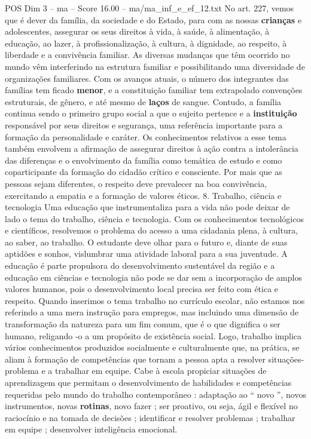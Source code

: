 \begin{textsample}{POS Dim 3 – ma – Score 16.00 – ma/ma\_inf\_e\_ef\_12.txt}
No art. 227, vemos que é dever da família, da sociedade e do Estado, para com as nossas \textbf{crianças} e adolescentes, assegurar os seus direitos à vida, à saúde, à alimentação, à educação, ao lazer, à profissionalização, à cultura, à dignidade, ao respeito, à liberdade e a convivência familiar.
As diversas mudanças que têm ocorrido no mundo vêm interferindo na estrutura familiar e possibilitando uma diversidade de organizações familiares.
Com os avanços atuais, o número dos integrantes das famílias tem ficado \textbf{menor}, e a constituição familiar tem extrapolado convenções estruturais, de gênero, e até mesmo de \textbf{laços} de sangue.
Contudo, a família continua sendo o primeiro grupo social a que o sujeito pertence e a \textbf{instituição} responsável por seus direitos e segurança, uma referência importante para a formação da personalidade e caráter.
Os conhecimentos relativos a esse tema também envolvem a afirmação de assegurar direitos à ação contra a intolerância das diferenças e o envolvimento da família como temática de estudo e como coparticipante da formação do cidadão crítico e consciente.
Por mais que as pessoas sejam diferentes, o respeito deve prevalecer na boa convivência, exercitando a empatia e a formação de valores éticos. 8.
Trabalho, ciência e tecnologia Uma educação que instrumentaliza para a vida não pode deixar de lado o tema do trabalho, ciência e tecnologia.
Com os conhecimentos tecnológicos e científicos, resolvemos o problema do acesso a uma cidadania plena, à cultura, ao saber, ao trabalho.
O estudante deve olhar para o futuro e, diante de suas aptidões e sonhos, vislumbrar uma atividade laboral para a sua juventude.
A educação é parte propulsora do desenvolvimento sustentável da região e a educação em ciências e tecnologia não pode se dar sem a incorporação de amplos valores humanos, pois o desenvolvimento local precisa ser feito com ética e respeito.
Quando inserimos o tema trabalho no currículo escolar, não estamos nos referindo a uma mera instrução para empregos, mas incluindo uma dimensão de transformação da natureza para um fim comum, que é o que dignifica o ser humano, religando -o a um propósito de existência social.
Logo, trabalho implica vários conhecimentos produzidos socialmente e culturalmente que, na prática, se aliam à formação de competências que tornam a pessoa apta a resolver situações-problema e a trabalhar em equipe.
Cabe à escola propiciar situações de aprendizagem que permitam o desenvolvimento de habilidades e competências requeridas pelo mundo do trabalho contemporâneo : adaptação ao “ novo ”, novos instrumentos, novas \textbf{rotinas}, novo fazer ; ser proativo, ou seja, ágil e flexível no raciocínio e na tomada de decisões ; identificar e resolver problemas ; trabalhar em equipe ; desenvolver inteligência emocional.

\end{textsample}
